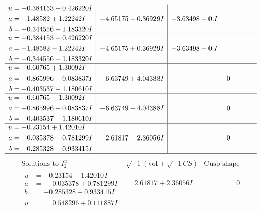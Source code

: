 \documentclass[1p]{elsarticle_modified}
\theoremstyle{definition}
\newcommand{\I}{\sqrt{-1}}
\begin{document}
$$\begin{array}{c|c|c}
\begin{aligned}
u &= -0.384153 + 0.426220 I \\
a &= -1.48582 + 1.22242 I \\
b &= -0.344556 + 1.183320 I\end{aligned}
 & -4.65175 - 0.36929 I & -3.63498 + 0. I\phantom{ +0.000000I} \\ \hline\begin{aligned}
u &= -0.384153 - 0.426220 I \\
a &= -1.48582 - 1.22242 I \\
b &= -0.344556 - 1.183320 I\end{aligned}
 & -4.65175 + 0.36929 I & -3.63498 + 0. I\phantom{ +0.000000I} \\ \hline\begin{aligned}
u &= \phantom{-}0.60765 + 1.30092 I \\
a &= -0.865996 + 0.083837 I \\
b &= -0.403537 - 1.180610 I\end{aligned}
 & -6.63749 + 4.04388 I & \phantom{-0.000000 } 0 \\ \hline\begin{aligned}
u &= \phantom{-}0.60765 - 1.30092 I \\
a &= -0.865996 - 0.083837 I \\
b &= -0.403537 + 1.180610 I\end{aligned}
 & -6.63749 - 4.04388 I & \phantom{-0.000000 } 0 \\ \hline\begin{aligned}
u &= -0.23154 + 1.42010 I \\
a &= \phantom{-}0.035378 - 0.781299 I \\
b &= -0.285328 + 0.933415 I\end{aligned}
 & \phantom{-}2.61817 - 2.36056 I & \phantom{-0.000000 } 0\\
 \hline 
 \end{array}$$\newpage$$\begin{array}{c|c|c}  
\text{Solutions to }I^u_{2}& \I (\text{vol} + \sqrt{-1}CS) & \text{Cusp shape}\\
 \hline 
\begin{aligned}
u &= -0.23154 - 1.42010 I \\
a &= \phantom{-}0.035378 + 0.781299 I \\
b &= -0.285328 - 0.933415 I\end{aligned}
 & \phantom{-}2.61817 + 2.36056 I & \phantom{-0.000000 } 0 \\ \hline\begin{aligned}
u &= \phantom{-}0.548296 + 0.111887 I \\

\end{aligned}
\end{array}$$
\end{document}
